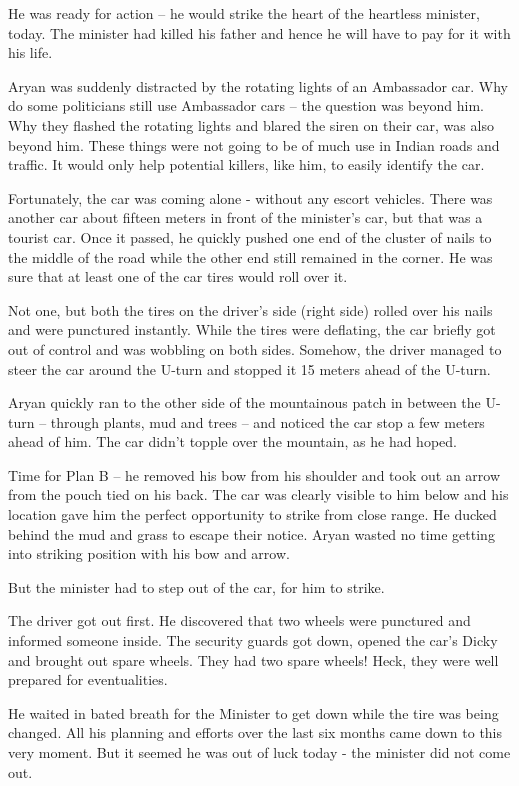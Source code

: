 He was ready for action – he would strike the heart of the heartless minister,
today. The minister had killed his father and hence he will have to pay for it
with his life.

Aryan was suddenly distracted by the rotating lights of an Ambassador car. Why
do some politicians still use Ambassador cars – the question was beyond him. Why
they flashed the rotating lights and blared the siren on their car, was also
beyond him. These things were not going to be of much use in Indian roads and
traffic. It would only help potential killers, like him, to easily identify the
car.

Fortunately, the car was coming alone - without any escort vehicles. There was
another car about fifteen meters in front of the minister's car, but that was a
tourist car. Once it passed, he quickly pushed one end of the cluster of nails
to the middle of the road while the other end still remained in the corner. He
was sure that at least one of the car tires would roll over it.

Not one, but both the tires on the driver's side (right side) rolled over his
nails and were punctured instantly. While the tires were deflating, the car
briefly got out of control and was wobbling on both sides. Somehow, the driver
managed to steer the car around the U-turn and stopped it 15 meters ahead of the
U-turn.

Aryan quickly ran to the other side of the mountainous patch in between the
U-turn – through plants, mud and trees – and noticed the car stop a few meters
ahead of him. The car didn't topple over the mountain, as he had hoped.

Time for Plan B – he removed his bow from his shoulder and took out an arrow
from the pouch tied on his back. The car was clearly visible to him below and
his location gave him the perfect opportunity to strike from close range. He
ducked behind the mud and grass to escape their notice. Aryan wasted no time
getting into striking position with his bow and arrow.

But the minister had to step out of the car, for him to strike.

The driver got out first. He discovered that two wheels were punctured and
informed someone inside. The security guards got down, opened the car's Dicky
and brought out spare wheels. They had two spare wheels! Heck, they were well
prepared for eventualities.

He waited in bated breath for the Minister to get down while the tire was being
changed. All his planning and efforts over the last six months came down to this
very moment. But it seemed he was out of luck today - the minister did not come
out.

